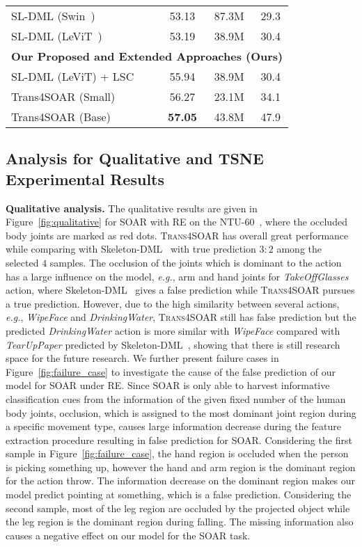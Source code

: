 \documentclass[lettersize,journal]{IEEEtran}
\begin{document}
\begin{table}[t]
{\begin{tabular}{lccc}
SL-DML (Swin~\cite{liu2021swin}) & 53.13 & 87.3M & 29.3 \\
SL-DML (LeViT~\cite{graham2021levit}) & 53.19 & 38.9M & 30.4\\ 
\midrule
\multicolumn{4}{l}{\textbf{Our Proposed and Extended Approaches (Ours)}} \\ 
\midrule
SL-DML (LeViT) + LSC & 55.94 & 38.9M & 30.4 \\
Trans4SOAR (Small) & 56.27 & 23.1M & 34.1\\
Trans4SOAR (Base) & \textbf{57.05} & 43.8M & 47.9\\
\bottomrule
\end{tabular}}
\end{table}

\subsection{Analysis for Qualitative and TSNE Experimental Results}
\noindent\textbf{Qualitative analysis. }The qualitative results are given in Figure~\ref{fig:qualitative} for SOAR with RE on the NTU-60~\cite{shahroudy2016ntu}, where the occluded body joints are marked as red dots. \textsc{Trans4SOAR} has overall great performance while comparing with Skeleton-DML~\cite{memmesheimer2020skeleton_dml} with true prediction $3:2$ among the selected $4$ samples. The occlusion of the joints which is dominant to the action has a large influence on the model, \textit{e.g.}, arm and hand joints for \emph{TakeOffGlasses} action, where Skeleton-DML~\cite{memmesheimer2020skeleton_dml} gives a false prediction while \textsc{Trans4SOAR} pursues a true prediction. However, due to the high similarity between several actions, \textit{e.g.}, \emph{WipeFace} and \emph{DrinkingWater}, \textsc{Trans4SOAR} still has false prediction but the predicted \emph{DrinkingWater} action is more similar with \emph{WipeFace} compared with \emph{TearUpPaper} predicted by Skeleton-DML~\cite{memmesheimer2020skeleton_dml}, showing that there is still research space for the future research.
We further present failure cases in Figure~\ref{fig:failure_case} to investigate the cause of the false prediction of our model for SOAR under RE. Since SOAR is only able to harvest informative classification cues from the information of the given fixed number of the human body joints, occlusion, which is assigned to the most dominant joint region during a specific movement type, causes large information decrease during the feature extraction procedure resulting in false prediction for SOAR. Considering the first sample in Figure~\ref{fig:failure_case}, the hand region is occluded when the person is picking something up, however the hand and arm region is the dominant region for the action throw. The information decrease on the dominant region makes our model predict pointing at something, which is a false prediction. Considering the second sample, most of the leg region are occluded by the projected object while the leg region is the dominant region during falling. The missing information also causes a negative effect on our model for the SOAR task.
\end{document}
